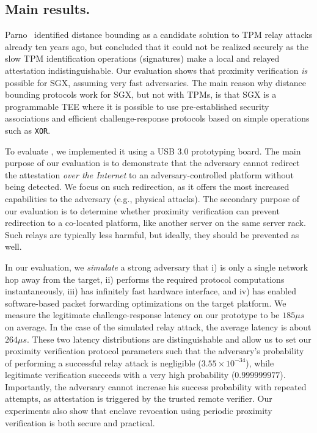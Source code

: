 \subsection{Main results.} Parno~\cite{parno2008bootstrapping} identified distance bounding as a candidate solution to TPM relay attacks already ten years ago, but concluded that it could not be realized securely as the slow TPM identification operations (signatures) make a local and relayed attestation indistinguishable. Our evaluation shows that proximity verification \emph{is} possible for SGX, assuming very fast adversaries. The main reason why distance bounding protocols work for SGX, but not with TPMs, is that SGX is a programmable TEE where it is possible to use pre-established security associations and efficient challenge-response protocols based on simple operations such as \texttt{XOR}.

To evaluate \name, we implemented it using a USB 3.0 prototyping board. The main purpose of our evaluation is to demonstrate that the adversary cannot redirect the attestation \emph{over the Internet} to an adversary-controlled platform without being detected. We focus on such redirection, as it offers the most increased capabilities to the adversary (e.g., physical attacks). The secondary purpose of our evaluation is to determine whether proximity verification can prevent redirection to a co-located platform, like another server on the same server rack. Such relays are typically less harmful, but ideally, they should be prevented as well.



In our evaluation, we \emph{simulate} a strong adversary that i) is only a single network hop away from the target, ii) performs the required protocol computations instantaneously, iii) has infinitely fast hardware interface, and iv) has enabled software-based packet forwarding optimizations on the target platform. We measure the legitimate challenge-response latency on our prototype to be $185 \mu s$ on average. In the case of the simulated relay attack, the average latency is about $264 \mu s$. These two latency distributions are distinguishable and allow us to set our proximity verification protocol parameters such that the adversary's probability of performing a successful relay attack is negligible ($3.55\times 10^{-34}$), while legitimate verification succeeds with a very high probability ($0.999999977$). Importantly, the adversary cannot increase his success probability with repeated attempts, as attestation is triggered by the trusted remote verifier. Our experiments also show that enclave revocation using periodic proximity verification is both secure and practical.


